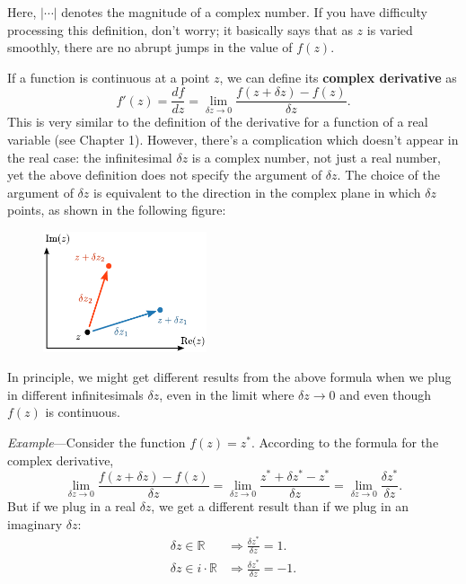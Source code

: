 \documentclass[10pt,a4paper]{article}
\begin{document}
\noindent
Here, $\big|\cdots\big|$ denotes the magnitude of a complex number. If
you have difficulty processing this definition, don't worry; it
basically says that as $z$ is varied smoothly, there are no abrupt
jumps in the value of $f(z)$.

If a function is continuous at a point $z$, we can define its
\textbf{complex derivative} as
\begin{equation}
f'(z) = \frac{df}{dz} = \lim_{\delta z\rightarrow 0} \frac{f(z+\delta z) - f(z)}{\delta z}.
\end{equation}
This is very similar to the definition of the derivative for a
function of a real variable (see Chapter 1). However, there's a
complication which doesn't appear in the real case: the infinitesimal
$\delta z$ is a complex number, not just a real number, yet the above
definition does not specify the argument of $\delta z$. The choice of
the argument of $\delta z$ is equivalent to the direction in the
complex plane in which $\delta z$ points, as shown in the following
figure:

\begin{figure}[ht]
  \centering\includegraphics[width=0.43\textwidth]{complex_derivative}
\end{figure}

\clearpage
In principle, we might get different results from the above formula when
we plug in different infinitesimals $\delta z$, even in the limit
where $\delta z \rightarrow 0$ and even though $f(z)$ is continuous.

\begin{framed}\noindent
  \textit{Example}---Consider the function $f(z) = z^*$. According to
  the formula for the complex derivative,
\begin{equation}
  \lim_{\delta z \rightarrow0} \frac{f(z+\delta z) - f(z)}{\delta z} = \lim_{\delta z \rightarrow0} \frac{z^*+\delta z^* - z^*}{\delta z} = \lim_{\delta z \rightarrow0} \frac{\delta z^*}{\delta z}.
\end{equation}
But if we plug in a real $\delta z$, we get a different result than if
we plug in an imaginary $\delta z$:
\begin{align}\delta z \in \mathbb{R} \;\; &\Rightarrow \frac{\delta z^*}{\delta z} = 1.\\ \delta z \in i \cdot \mathbb{R} &\Rightarrow \frac{\delta z^*}{\delta z} = -1.
\end{align}
\end{framed}
\end{document}
